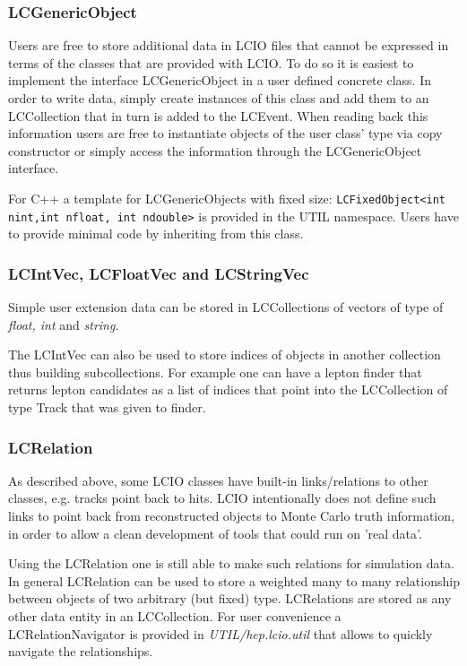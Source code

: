 \documentclass[twoside]{article}
\begin{document}
\subsubsection{LCGenericObject}
Users are free to store additional data in LCIO files that cannot be expressed in terms of the classes that 
are provided with LCIO. To do so it is easiest to implement the interface LCGenericObject in a user defined
concrete class. In order to write data, simply create instances of this class and add them to an LCCollection
that in turn is added to the LCEvent. When reading back this information users are free to instantiate 
objects of the user class' type via copy constructor or simply access the information through the
LCGenericObject interface.

For C++ a template for LCGenericObjects with fixed size: \verb$LCFixedObject<int nint,int nfloat, int ndouble>$ 
is provided in the UTIL namespace. Users have to provide minimal code by inheriting from this class.

\subsubsection{LCIntVec, LCFloatVec and LCStringVec}
Simple user extension data can be stored in LCCollections of vectors of type of {\em float, int} and {\em string}. 

The LCIntVec can also be used to store indices of objects in another collection thus building
subcollections. For example one can have a lepton finder that returns lepton candidates as a list of 
indices that point into the LCCollection of type Track that was given to finder.

\subsubsection{LCRelation}
As described above, some LCIO classes have built-in links/relations to other classes, e.g. tracks point back to 
hits. LCIO intentionally does not define such links to point back from reconstructed objects to Monte Carlo truth 
information, in order to allow a clean development of tools that could run on 'real data'.

Using the LCRelation one is still able to make such relations for simulation data. In general LCRelation can be
used to store a weighted many to many relationship between objects of two arbitrary (but fixed) type.
LCRelations are stored as any other data entity in an LCCollection. For user convenience a LCRelationNavigator
is provided in {\it UTIL/hep.lcio.util} that allows to quickly navigate the relationships.
\end{document}
